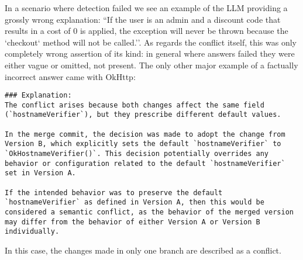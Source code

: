 In a scenario where detection failed we see an example of the LLM providing a grossly wrong explanation: ``If the user is an admin and a discount code that results in a cost of 0 is applied, the exception will never be thrown because the `checkout` method will not be called.''. As regards the conflict itself, this was only completely wrong assertion of its kind: in general where answers failed they were either vague or omitted, not present. The only other major example of a factually incorrect answer came with OkHttp:
\begin{lstlisting}
### Explanation:
The conflict arises because both changes affect the same field (`hostnameVerifier`), but they prescribe different default values.
    
In the merge commit, the decision was made to adopt the change from Version B, which explicitly sets the default `hostnameVerifier` to `OkHostnameVerifier()`. This decision potentially overrides any behavior or configuration related to the default `hostnameVerifier` set in Version A.
    
If the intended behavior was to preserve the default `hostnameVerifier` as defined in Version A, then this would be considered a semantic conflict, as the behavior of the merged version may differ from the behavior of either Version A or Version B individually.
\end{lstlisting}
In this case, the changes made in only one branch are described as a conflict.

